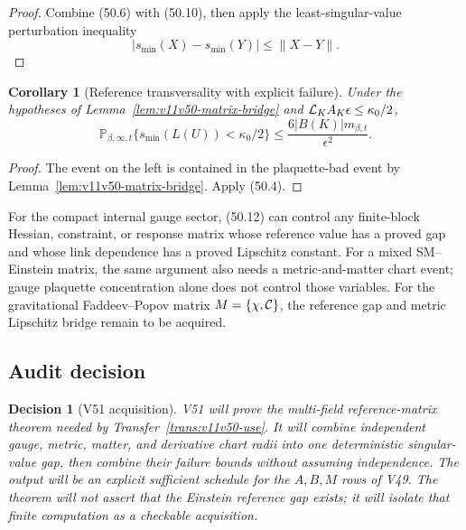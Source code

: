 \documentclass[11pt]{article}
\newtheorem{corollary}[theorem]{Corollary}
\newtheorem{decision}[theorem]{Decision}
\begin{document}
\begin{proof}
Combine (50.6) with (50.10), then apply the least-singular-value
perturbation inequality
\[
 |s_{\min}(X)-s_{\min}(Y)|\le\lVert X-Y\rVert.
\]
\end{proof}

\begin{corollary}[Reference transversality with explicit failure]
\label{cor:v11v50-reference}
Under the hypotheses of Lemma~\ref{lem:v11v50-matrix-bridge} and
\({\cal L}_KA_K\epsilon\le\kappa_0/2\),
\[
 \mathbb P_{\beta,\infty,t}
       \{s_{\min}(L(U))<\kappa_0/2\}
 \le\frac{6|B(K)|m_{\beta,t}}{\epsilon^2}.                    \tag{50.12}
\]
\end{corollary}

\begin{proof}
The event on the left is contained in the plaquette-bad event by
Lemma~\ref{lem:v11v50-matrix-bridge}.  Apply (50.4).
\end{proof}

\begin{transfer}
\label{trans:v11v50-use}
For the compact internal gauge sector, (50.12) can control any
finite-block Hessian, constraint, or response matrix whose reference
value has a proved gap and whose link dependence has a proved
Lipschitz constant.  For a mixed SM--Einstein matrix, the same argument
also needs a metric-and-matter chart event; gauge plaquette
concentration alone does not control those variables.  For the
gravitational Faddeev--Popov matrix \(M=\{\chi,{\cal C}\}\), the
reference gap and metric Lipschitz bridge remain to be acquired.
\end{transfer}

\subsection{Audit decision}

\begin{decision}[V51 acquisition]
\label{dec:v11v50-next}
V51 will prove the multi-field reference-matrix theorem needed by
Transfer~\ref{trans:v11v50-use}.  It will combine independent gauge,
metric, matter, and derivative chart radii into one deterministic
singular-value gap, then combine their failure bounds without assuming
independence.  The output will be an explicit sufficient schedule for
the \(A,B,M\) rows of V49.  The theorem will not assert that the
Einstein reference gap exists; it will isolate that finite computation
as a checkable acquisition.
\end{decision}
\end{document}
